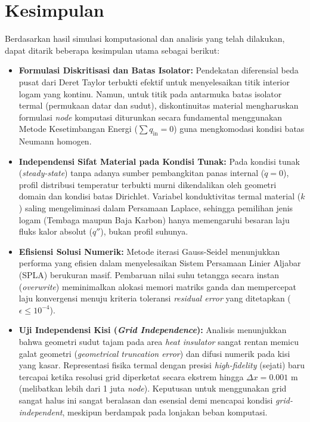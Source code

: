 \documentclass[12pt,a4paper]{article}
\begin{document}
\section{Kesimpulan}
Berdasarkan hasil simulasi komputasional dan analisis yang telah dilakukan, dapat ditarik beberapa kesimpulan utama sebagai berikut:
\begin{itemize}
    \item \textbf{Formulasi Diskritisasi dan Batas Isolator:} Pendekatan diferensial beda pusat dari Deret Taylor terbukti efektif untuk menyelesaikan titik interior logam yang kontinu. Namun, untuk titik pada antarmuka batas isolator termal (permukaan datar dan sudut), diskontinuitas material mengharuskan formulasi \textit{node} komputasi diturunkan secara fundamental menggunakan Metode Kesetimbangan Energi ($\sum q_{\text{in}} = 0$) guna mengkomodasi kondisi batas Neumann homogen.
    
    \item \textbf{Independensi Sifat Material pada Kondisi Tunak:} Pada kondisi tunak (\textit{steady-state}) tanpa adanya sumber pembangkitan panas internal ($\dot{q} = 0$), profil distribusi temperatur terbukti murni dikendalikan oleh geometri domain dan kondisi batas Dirichlet. Variabel konduktivitas termal material ($k$) saling mengeliminasi dalam Persamaan Laplace, sehingga pemilihan jenis logam (Tembaga maupun Baja Karbon) hanya memengaruhi besaran laju fluks kalor absolut ($q''$), bukan profil suhunya.
    
    \item \textbf{Efisiensi Solusi Numerik:} Metode iterasi Gauss-Seidel menunjukkan performa yang efisien dalam menyelesaikan Sistem Persamaan Linier Aljabar (SPLA) berukuran masif. Pembaruan nilai suhu tetangga secara instan (\textit{overwrite}) meminimalkan alokasi memori matriks ganda dan mempercepat laju konvergensi menuju kriteria toleransi \textit{residual error} yang ditetapkan ($\epsilon \leq 10^{-4}$).
    
    \item \textbf{Uji Independensi Kisi (\textit{Grid Independence}):} Analisis menunjukkan bahwa geometri sudut tajam pada area \textit{heat insulator} sangat rentan memicu galat geometri (\textit{geometrical truncation error}) dan difusi numerik pada kisi yang kasar. Representasi fisika termal dengan presisi \textit{high-fidelity} (sejati) baru tercapai ketika resolusi grid diperketat secara ekstrem hingga $\Delta x = 0.001\text{ m}$ (melibatkan lebih dari 1 juta \textit{node}). Keputusan untuk menggunakan grid sangat halus ini sangat beralasan dan esensial demi mencapai kondisi \textit{grid-independent}, meskipun berdampak pada lonjakan beban komputasi.
\end{itemize}
\end{document}

